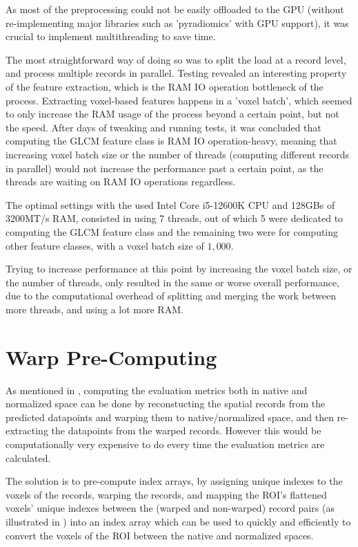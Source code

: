 As most of the preprocessing could not be easily offloaded to the GPU (without re-implementing major libraries such as 'pyradiomics' with GPU support), it was crucial to implement multithreading to save time.\par
The most straightforward way of doing so was to split the load at a record level, and process multiple records in parallel. Testing revealed an interesting property of the feature extraction, which is the RAM IO operation bottleneck of the process. Extracting voxel-based features happens in a 'voxel batch', which seemed to only increase the RAM usage of the process beyond a certain point, but not the speed. After days of tweaking and running tests, it was concluded that computing the \ac{GLCM} feature class is RAM IO operation-heavy, meaning that increasing voxel batch size or the number of threads (computing different records in parallel) would not increase the performance past a certain point, as the threads are waiting on RAM IO operations regardless. \par
The optimal settings with the used Intel Core i5-12600K CPU and 128GBs of 3200MT/s RAM, consisted in using 7 threads, out of which 5 were dedicated to computing the GLCM feature class and the remaining two were for computing other feature classes, with a voxel batch size of $1,000$.\par
Trying to increase performance at this point by increasing the voxel batch size, or the number of threads, only resulted in the same or worse overall performance, due to the computational overhead of splitting and merging the work between more threads, and using a lot more RAM.

\section{Warp Pre-Computing}
\label{app:imp-pre}

As mentioned in , computing the evaluation metrics both in native and normalized space can be done by reconstucting the spatial records from the predicted datapoints and warping them to native/normalized space, and then re-extracting the datapoints from the warped records. However this would be computationally very expensive to do every time the evaluation metrics are calculated.\par
The solution is to pre-compute index arrays, by assigning unique indexes to the voxels of the records, warping the records, and mapping the \ac{ROI}'s flattened voxels' unique indexes between the (warped and non-warped) record pairs (as illustrated in ) into an index array which can be used to quickly and efficiently to convert the voxels of the \ac{ROI} between the native and normalized spaces.

